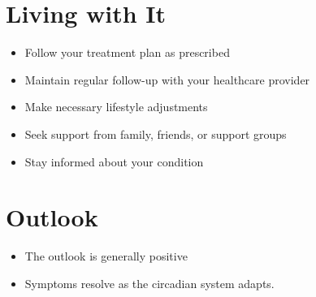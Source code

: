 \section{Living with It}
\begin{itemize}[noitemsep]
  \item Follow your treatment plan as prescribed
  \item Maintain regular follow-up with your healthcare provider
  \item Make necessary lifestyle adjustments
  \item Seek support from family, friends, or support groups
  \item Stay informed about your condition
\end{itemize}
\section{Outlook}
\begin{itemize}[noitemsep]
  \item The outlook is generally positive
  \item Symptoms resolve as the circadian system adapts.
\end{itemize}
